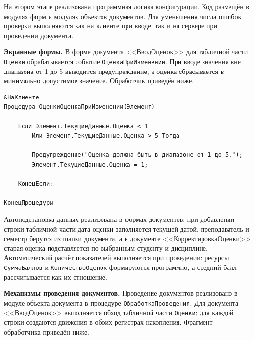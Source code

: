 \documentclass[14pt,a4paper]{extarticle}
\begin{document}
На втором этапе реализована программная логика конфигурации. Код размещён в
модулях форм и модулях объектов документов. Для уменьшения числа ошибок
проверки выполняются как на клиенте при вводе, так и на сервере при проведении
документа.

\noindent\textbf{Экранные формы.}
В форме документа <<ВводОценок>> для табличной части \texttt{Оценки}
обрабатывается событие \texttt{ОценкаПриИзменении}. При вводе значения вне
диапазона от 1 до 5 выводится предупреждение, а оценка сбрасывается в
минимально допустимое значение. Обработчик приведён ниже.

{\small
\begin{verbatim}
&НаКлиенте
Процедура ОценкиОценкаПриИзменении(Элемент)

    Если Элемент.ТекущиеДанные.Оценка < 1
        Или Элемент.ТекущиеДанные.Оценка > 5 Тогда

        Предупреждение("Оценка должна быть в диапазоне от 1 до 5.");
        Элемент.ТекущиеДанные.Оценка = 1;

    КонецЕсли;

КонецПроцедуры
\end{verbatim}
}

Автоподстановка данных реализована в формах документов: при добавлении строки
табличной части дата оценки заполняется текущей датой, преподаватель и семестр
берутся из шапки документа, а в документе <<КорректировкаОценки>> старая оценка
подставляется по выбранным студенту и дисциплине. Автоматический расчёт
показателей выполняется при проведении: ресурсы \texttt{СуммаБаллов} и
\texttt{КоличествоОценок} формируются программно, а средний балл рассчитывается
как их отношение.

\noindent\textbf{Механизмы проведения документов.}
Проведение документов реализовано в модуле объекта документа в процедуре
\texttt{ОбработкаПроведения}. Для документа <<ВводОценок>> выполняется обход
табличной части \texttt{Оценки}; для каждой строки создаются движения в обоих
регистрах накопления. Фрагмент обработчика приведён ниже.
\end{document}
